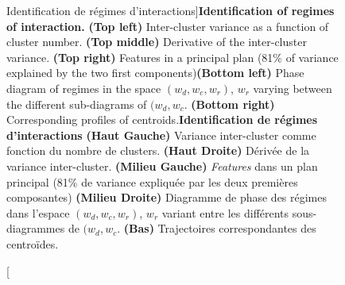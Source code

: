 \begin{figure}
\caption[Identification of interaction regimes][Identification de régimes d'interactions]{\textbf{Identification of regimes of interaction.} \textbf{(Top left)} Inter-cluster variance as a function of cluster number. \textbf{(Top middle)} Derivative of the inter-cluster variance. \textbf{(Top right)} Features in a principal plan (81\% of variance explained by the two first components)\textbf{(Bottom left)} Phase diagram of regimes in the space $(w_{d},w_{c},w_{r})$, $w_r$ varying between the different sub-diagrams of $(w_{d},w_{c}$. \textbf{(Bottom right)} Corresponding profiles of centroids.\label{fig:causalityregimes:clustering}}{\textbf{Identification de régimes d'interactions} \textbf{(Haut Gauche)} Variance inter-cluster comme fonction du nombre de clusters. \textbf{(Haut Droite)} Dérivée de la variance inter-cluster. \textbf{(Milieu Gauche)} \emph{Features} dans un plan principal (81\% de variance expliquée par les deux premières composantes) \textbf{(Milieu Droite)} Diagramme de phase des régimes dans l'espace $(w_{d},w_{c},w_{r})$, $w_r$ variant entre les différents sous-diagrammes de $(w_{d},w_{c}$. \textbf{(Bas)} Trajectoires correspondantes des centroïdes.\label{fig:causalityregimes:clustering}}
\end{figure}



